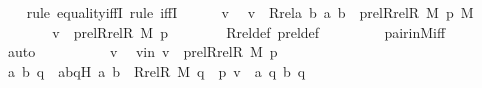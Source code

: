 \begin{isabellebody}
\ \ \isamarkupfalse%
\ {\isacharparenleft}{\kern0pt}rule\ equality{\isacharunderscore}{\kern0pt}iffI{\isacharcomma}{\kern0pt}\ rule\ iffI{\isacharparenright}{\kern0pt}\isanewline
\ \ \ \ \isamarkupfalse%
\ v\ \isamarkupfalse%
\ {\isachardoublequoteopen}v\ {\isasymin}\ Rrel{\isacharparenleft}{\kern0pt}{\isasymlambda}a\ b{\isachardot}{\kern0pt}\ {\isasymlangle}a{\isacharcomma}{\kern0pt}\ b{\isasymrangle}\ {\isasymin}\ prel{\isacharparenleft}{\kern0pt}Rrel{\isacharparenleft}{\kern0pt}R{\isacharcomma}{\kern0pt}\ M{\isacharparenright}{\kern0pt}{\isacharcomma}{\kern0pt}\ p{\isacharparenright}{\kern0pt}{\isacharcomma}{\kern0pt}\ M{\isacharparenright}{\kern0pt}{\isachardoublequoteclose}\isanewline
\ \ \ \ \isamarkupfalse%
\ \isamarkupfalse%
\ {\isachardoublequoteopen}v\ {\isasymin}\ prel{\isacharparenleft}{\kern0pt}Rrel{\isacharparenleft}{\kern0pt}R{\isacharcomma}{\kern0pt}\ M{\isacharparenright}{\kern0pt}{\isacharcomma}{\kern0pt}\ p{\isacharparenright}{\kern0pt}{\isachardoublequoteclose}\isanewline
\ \ \ \ \ \ \isamarkupfalse%
\ Rrel{\isacharunderscore}{\kern0pt}def\ prel{\isacharunderscore}{\kern0pt}def\ \isanewline
\ \ \ \ \ \ \isamarkupfalse%
\ pair{\isacharunderscore}{\kern0pt}in{\isacharunderscore}{\kern0pt}M{\isacharunderscore}{\kern0pt}iff\ \isanewline
\ \ \ \ \ \ \isamarkupfalse%
\ auto\isanewline
\ \ \isamarkupfalse%
\ \isanewline
\ \ \ \ \isamarkupfalse%
\ v\ \isamarkupfalse%
\ vin{\isacharcolon}{\kern0pt}\ {\isachardoublequoteopen}v\ {\isasymin}\ prel{\isacharparenleft}{\kern0pt}Rrel{\isacharparenleft}{\kern0pt}R{\isacharcomma}{\kern0pt}\ M{\isacharparenright}{\kern0pt}{\isacharcomma}{\kern0pt}\ p{\isacharparenright}{\kern0pt}\ {\isachardoublequoteclose}\isanewline
\ \ \ \ \isamarkupfalse%
\ \isamarkupfalse%
\ a\ b\ q\ \ abqH{\isacharcolon}{\kern0pt}\ {\isachardoublequoteopen}{\isacharless}{\kern0pt}a{\isacharcomma}{\kern0pt}\ b{\isachargreater}{\kern0pt}\ {\isasymin}\ Rrel{\isacharparenleft}{\kern0pt}R{\isacharcomma}{\kern0pt}\ M{\isacharparenright}{\kern0pt}{\isachardoublequoteclose}\ {\isachardoublequoteopen}q\ {\isasymin}\ p{\isachardoublequoteclose}\ {\isachardoublequoteopen}v\ {\isacharequal}{\kern0pt}\ {\isacharless}{\kern0pt}{\isacharless}{\kern0pt}a{\isacharcomma}{\kern0pt}\ q{\isachargreater}{\kern0pt}{\isacharcomma}{\kern0pt}\ {\isacharless}{\kern0pt}b{\isacharcomma}{\kern0pt}\ q{\isachargreater}{\kern0pt}{\isachargreater}{\kern0pt}{\isachardoublequoteclose}\ \isamarkupfalse%

\end{isabellebody}
